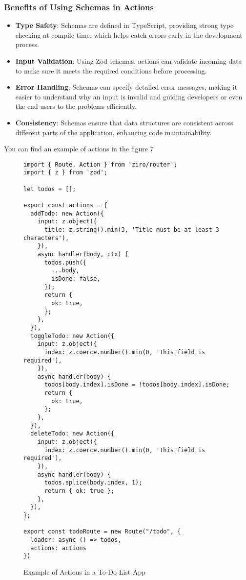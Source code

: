 \subsubsection*{Benefits of Using Schemas in Actions}

\begin{itemize}
  \item \textbf{Type Safety}: Schemas are defined in TypeScript, providing strong type checking at compile time, which helps catch errors early in the development process.

  \item \textbf{Input Validation}: Using Zod schemas, actions can validate incoming data to make sure it meets the required conditions before processing.

  \item \textbf{Error Handling}: Schemas can specify detailed error messages, making it easier to understand why an input is invalid and guiding developers or even the end-users to the problems efficiently.

  \item \textbf{Consistency}: Schemas ensure that data structures are consistent across different parts of the application, enhancing code maintainability.
\end{itemize}

You can find an example of actions in the figure 7

\begin{figure}[h!]
\begin{verbatim}
import { Route, Action } from 'ziro/router';
import { z } from 'zod';

let todos = [];

export const actions = {
  addTodo: new Action({
    input: z.object({
      title: z.string().min(3, 'Title must be at least 3 characters'),
    }),
    async handler(body, ctx) {
      todos.push({
        ...body,
        isDone: false,
      });
      return {
        ok: true,
      };
    },
  }),
  toggleTodo: new Action({
    input: z.object({
      index: z.coerce.number().min(0, 'This field is required'),
    }),
    async handler(body) {
      todos[body.index].isDone = !todos[body.index].isDone;
      return {
        ok: true,
      };
    },
  }),
  deleteTodo: new Action({
    input: z.object({
      index: z.coerce.number().min(0, 'This field is required'),
    }),
    async handler(body) {
      todos.splice(body.index, 1);
      return { ok: true };
    },
  }),
};

export const todoRoute = new Route("/todo", {
  loader: async () => todos,
  actions: actions
})
\end{verbatim}
\caption{Example of Actions in a To-Do List App}
\end{figure}
\pagebreak

